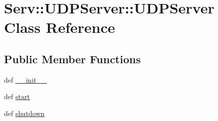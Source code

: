 \hypertarget{class_serv_1_1_u_d_p_server_1_1_u_d_p_server}{
\section{Serv::UDPServer::UDPServer Class Reference}
\label{class_serv_1_1_u_d_p_server_1_1_u_d_p_server}
}
\subsection*{Public Member Functions}
\begin{CompactItemize}
\item 
def \hyperlink{class_serv_1_1_u_d_p_server_1_1_u_d_p_server_08fcc38fca5727c085acc11c9df7f512}{\_\-\_\-init\_\-\_\-}
\item 
def \hyperlink{class_serv_1_1_u_d_p_server_1_1_u_d_p_server_9feda8e8dfee13803aa3fd07ddd003a1}{start}
\item 
def \hyperlink{class_serv_1_1_u_d_p_server_1_1_u_d_p_server_43b3b2016322a79953939e56653d226d}{shutdown}
\end{CompactItemize}
